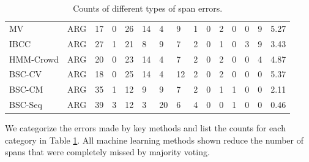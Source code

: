 \begin{table}[h]
\begin{tabular}{l l l l l l l l l l l l l l l }
\midrule 
MV & ARG & 17 &  0 & 26 & 14 &  4  &  9 & 1 &  0 & 2 &  0 &  0 & 9 & 5.27 \\
IBCC & ARG & 27 & 1 & 21 & 8 & 9 & 7 & 2 & 0 & 1 & 0 & 3 & 9 & 3.43 \\
HMM-Crowd & ARG & 20 & 0 & 23 & 14 & 4 & 7 & 2 & 0 & 2 & 0 & 0 & 4 & 4.87 \\
BSC-CV & ARG & 18 & 0 & 25 & 14 & 4 & 12 & 2 & 0 & 2 & 0 & 0 & 0 & 5.37 \\
BSC-CM & ARG & 35 & 1 & 12 & 9 & 9 & 7 & 2 & 0 & 1 & 1 & 0 & 0 & 2.11 \\
BSC-Seq & ARG & 39 & 3 & 12 & 3 & 20 & 6 & 4 & 0 & 0 & 1 & 0 & 0 & 0.46 \\
\bottomrule
\end{tabular}
\caption{Counts of different types of span errors.}
\label{tab:error_analysis}
\end{table}
We categorize the errors made by key methods and list the
counts for each category in Table \ref{tab:error_analysis}.
All machine learning methods shown reduce the number of spans that were completely missed by majority
voting. 

